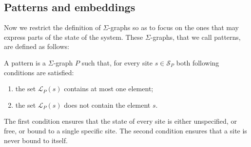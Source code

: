 \documentclass{entcs}
\newcommand{\graphsymb}{G}
\newcommand{\sites}[1][\graphsymb]{\mathcal{S}_{#1}}
\newcommand{\links}[1][\graphsymb]{\mathcal{L}_{#1}}
\begin{document}
\subsection{Patterns and embeddings}

Now we restrict the definition of $\Sigma$-graphs so as to
focus on the ones that may express parts of the state of the system.
These $\Sigma$-graphs, that we call patterns, are defined as follows:

\begin{defn}[patterns]
A pattern is a $\Sigma$-graph $P$ such that, for every site $s\in\sites[P]$ both following conditions are satisfied:
\begin{enumerate}
\item the set $\links[P](s)$ contains at most one element;
\item the set $\links[P](s)$ does not contain the element $s$.
\end{enumerate}
\end{defn}
The first condition ensures that the state of every site is either unspecified,
or free, or bound to a single specific site. The second condition ensures that a site is never bound to itself.
\end{document}
